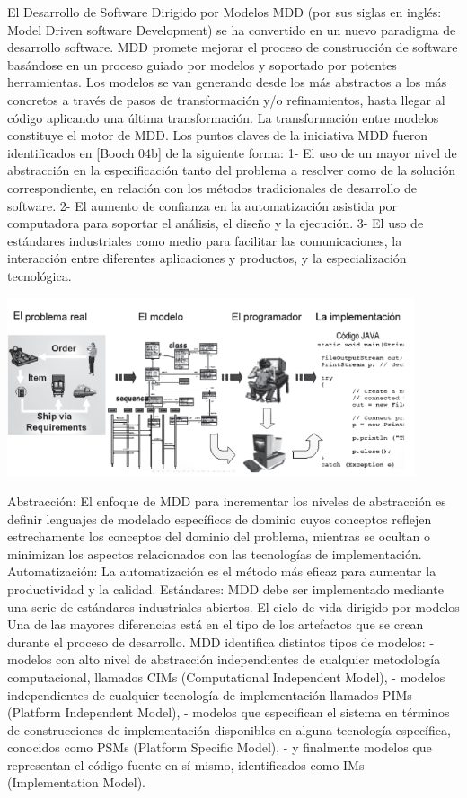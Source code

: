 El Desarrollo de Software Dirigido por Modelos MDD (por sus siglas en inglés: Model Driven software Development) se ha convertido en un nuevo paradigma de desarrollo software. MDD promete mejorar el proceso de construcción de software basándose en un proceso guiado por modelos y soportado por potentes herramientas.
Los modelos se van generando desde los más abstractos a los más concretos a través de pasos de transformación y/o refinamientos, hasta llegar al código aplicando una última transformación. La transformación entre modelos constituye el motor de MDD.
Los puntos claves de la iniciativa MDD fueron identificados en [Booch 04b] de la siguiente forma: 
1-	El uso de un mayor nivel de abstracción en la especificación tanto del problema a resolver como de la solución correspondiente, en relación con los métodos tradicionales de desarrollo de software. 
2-	El aumento de confianza en la automatización asistida por computadora para soportar el análisis, el diseño y la ejecución. 
3-	El uso de estándares industriales como medio para facilitar las comunicaciones, la interacción entre diferentes aplicaciones y productos, y la especialización tecnológica.

\begin{center}
    \includegraphics[width=12cm]{./Imagenes/mdd3}
    \end{center}

Abstracción: El enfoque de MDD para incrementar los niveles de abstracción es definir lenguajes de modelado específicos de dominio cuyos conceptos reflejen estrechamente los conceptos del dominio del problema, mientras se ocultan o minimizan los aspectos relacionados con las tecnologías de implementación.
Automatización: La automatización es el método más eficaz para aumentar la productividad y la calidad.
Estándares: MDD debe ser implementado mediante una serie de estándares industriales abiertos.
El ciclo de vida dirigido por modelos
Una de las mayores diferencias está en el tipo de los artefactos que se crean durante el proceso de desarrollo.
MDD identifica distintos tipos de modelos: - modelos con alto nivel de abstracción independientes de cualquier metodología computacional, llamados CIMs (Computational Independent Model), - modelos independientes de cualquier tecnología de implementación llamados PIMs (Platform Independent Model), - modelos que especifican el sistema en términos de construcciones de implementación disponibles en alguna tecnología específica, conocidos como PSMs (Platform Specific Model), - y finalmente modelos que representan el código fuente en sí mismo, identificados como IMs (Implementation Model).

